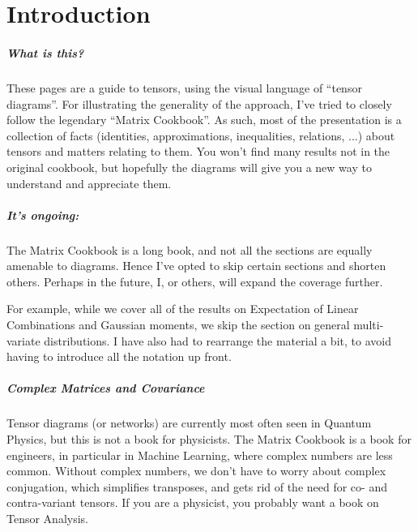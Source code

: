 
\chapter{Introduction}
\paragraph{What is this?}
These pages are a guide to tensors, using the visual language of ``tensor diagrams''.
For illustrating the generality of the approach, I've tried to closely follow the legendary ``Matrix Cookbook''.
As such, most of the presentation is a collection of facts (identities, approximations, inequalities, relations, ...) about tensors and matters relating to them.
You won't find many results not in the original cookbook, but hopefully the diagrams will give you a new way to understand and appreciate them.

\paragraph{It's ongoing:}
The Matrix Cookbook is a long book, and not all the sections are equally amenable to diagrams.
Hence I've opted to skip certain sections and shorten others.
Perhaps in the future, I, or others, will expand the coverage further.

For example, while we cover all of the results on Expectation of Linear Combinations and Gaussian moments, we skip the section on general multi-variate distributions.
I have also had to rearrange the material a bit, to avoid having to introduce all the notation up front.

\paragraph{Complex Matrices and Covariance}
Tensor diagrams (or networks) are currently most often seen in Quantum Physics,
but this is not a book for physicists.
The Matrix Cookbook is a book for engineers, in particular in Machine Learning, where complex numbers are less common.
Without complex numbers, we don't have to worry about complex conjugation, which simplifies transposes, and gets rid of the need for co- and contra-variant tensors.
If you are a physicist, you probably want a book on Tensor Analysis.


